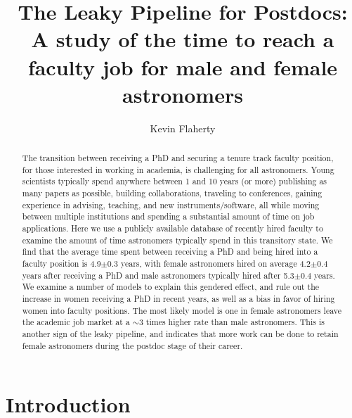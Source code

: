 \documentclass[modern]{aastex62}
\begin{document}
\title{The Leaky Pipeline for Postdocs: A study of the time to reach a faculty job for male and female astronomers}

\author[0000-0003-2657-1314]{Kevin Flaherty}

\begin{abstract}
The transition between receiving a PhD and securing a tenure track faculty position, for those interested in working in academia, is challenging for all astronomers. Young scientists typically spend anywhere between 1 and 10 years (or more)  publishing as many papers as possible, building collaborations, traveling to conferences, gaining experience in advising, teaching, and new instruments/software, all while moving between multiple institutions and spending a substantial amount of time on job applications. Here we use a publicly available database of recently hired faculty to examine the amount of time astronomers typically spend in this transitory state. We find that the average time spent between receiving a PhD and being hired into a faculty position is 4.9$\pm$0.3 years, with female astronomers hired on average 4.2$\pm$0.4 years after receiving a PhD and male astronomers typically hired after 5.3$\pm$0.4 years. We examine a number of models to explain this gendered effect, and rule out the increase in women receiving a PhD in recent years, as well as a bias in favor of hiring women into faculty positions. The most likely model is one in female astronomers leave the academic job market at a $\sim$3 times higher rate than male astronomers. This is another sign of the leaky pipeline, and indicates that more work can be done to retain female astronomers during the postdoc stage of their career.
\end{abstract}


\section{Introduction}
\end{document}
